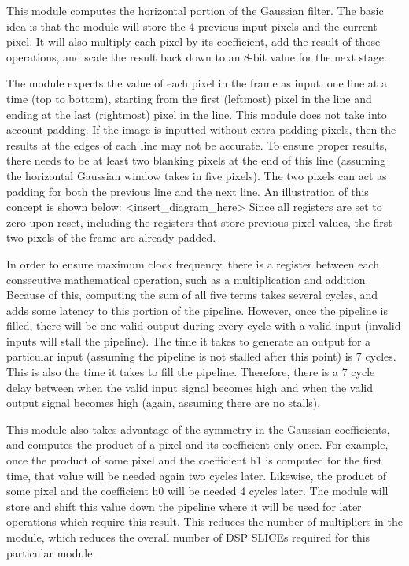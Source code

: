 \documentclass[12pt]{article}
\begin{document}
This module computes the horizontal portion of the Gaussian filter. The basic 
idea is that the module will store the 4 previous input pixels and the current 
pixel. It will also multiply each pixel by its coefficient, add the result of 
those operations, and scale the result back down to an 8-bit value for the next 
stage.

The module expects the value of each pixel in the frame as input, one line at 
a time (top to bottom), starting from the first (leftmost) pixel in the line and 
ending at the last (rightmost) pixel in the line. This module does not take into 
account padding. If the image is inputted without extra padding pixels, then the 
results at the edges of each line may not be accurate. To ensure proper results, 
there needs to be at least two blanking pixels at the end of this line (assuming 
the horizontal Gaussian window takes in five pixels). The two pixels can act as 
padding for both the previous line and the next line. An illustration of this 
concept is shown below: <insert\_diagram\_here> Since all registers are set to 
zero upon reset, including the registers that store previous pixel values, the 
first two pixels of the frame are already padded.

In order to ensure maximum clock frequency, there is a register between each 
consecutive mathematical operation, such as a multiplication and addition. 
Because of this, computing the sum of all five terms takes several cycles, and 
adds some latency to this portion of the pipeline. However, once the pipeline is 
filled, there will be one valid output during every cycle with a valid input 
(invalid inputs will stall the pipeline). The time it takes to generate an 
output for a particular input (assuming the pipeline is not stalled after this 
point) is 7 cycles. This is also the time it takes to fill the pipeline. 
Therefore, there is a 7 cycle delay between when the valid input signal becomes 
high and when the valid output signal becomes high (again, assuming there are no 
stalls).

This module also takes advantage of the symmetry in the Gaussian coefficients, 
and computes the product of a pixel and its coefficient only once. For example, 
once the product of some pixel and the coefficient h1 is computed for the first 
time, that value will be needed again two cycles later. Likewise, the product of 
some pixel and the coefficient h0 will be needed 4 cycles later. The module will 
store and shift this value down the pipeline where it will be used for later 
operations which require this result. This reduces the number of multipliers in 
the module, which reduces the overall number of DSP SLICEs required for this 
particular module.
\end{document}
